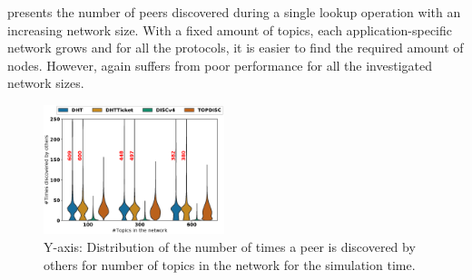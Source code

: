  presents the number of peers discovered during a single lookup operation with an increasing network size. With a fixed amount of topics, each application-specific network grows and for all the protocols, it is easier to find the required amount of nodes.
 However, \discv again suffers from poor performance for all the investigated network sizes. 

\iffalse %
\begin{figure}
\includegraphics[width=0.470\textwidth]{results/no_split/violin_topic_wasDiscovered.eps}
\caption{Y-axis: Distribution of the number of times a peer is discovered by others for number of topics in the network for the simulation time.}
\label{fig:discoveredByPerTopic}
\end{figure}

